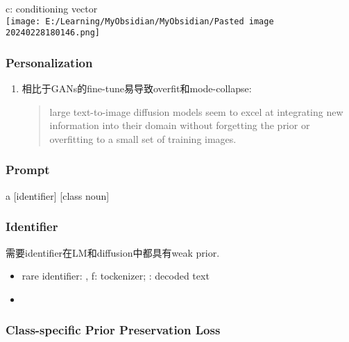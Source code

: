 \documentclass[
]{article}
\providecommand{\tightlist}{%
  \setlength{\itemsep}{0pt}\setlength{\parskip}{0pt}}
\begin{document}
c: conditioning vector\\
\texttt{[image: E:/Learning/MyObsidian/MyObsidian/Pasted image 20240228180146.png]}

\subsubsection{Personalization}\label{personalization}

\begin{enumerate}
\item
  相比于GANs的fine-tune易导致overfit和mode-collapse:

  \begin{quote}
  large text-to-image diffusion models seem to excel at integrating new
  information into their domain without forgetting the prior or
  overfitting to a small set of training images.
  \end{quote}
\end{enumerate}

\subsubsection{Prompt}\label{prompt}

a {[}identifier{]} {[}class noun{]}

\subsubsection{Identifier}\label{identifier}

需要identifier在LM和diffusion中都具有weak prior.

\begin{itemize}
\tightlist
\item
  rare identifier: {}, f: tockenizer; {}: decoded text
\item
\end{itemize}

\subsubsection{Class-specific Prior Preservation
Loss}\label{class-specific-prior-preservation-loss}
\end{document}
